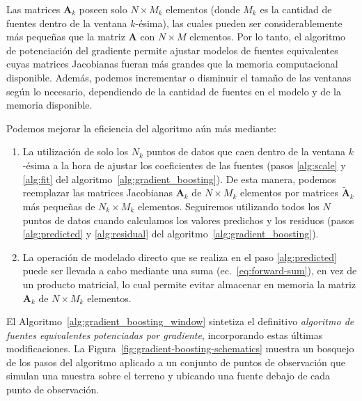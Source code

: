 Las matrices $\mathbf{A}_k$ poseen solo $N \times M_k$ elementos (donde $M_k$
es la cantidad de fuentes dentro de la ventana $k$-ésima), las cuales pueden
ser considerablemente más pequeñas que la matriz $\mathbf{A}$ con $N \times M$
elementos.
Por lo tanto, el algoritmo de potenciación del gradiente permite ajustar
modelos de fuentes equivalentes cuyas matrices Jacobianas fueran más grandes
que la memoria computacional disponible.
Además, podemos incrementar o disminuir el tamaño de las ventanas según lo
necesario, dependiendo de la cantidad de fuentes en el modelo y de la memoria
disponible.

Podemos mejorar la eficiencia del algoritmo aún más mediante:

\begin{enumerate}
  \item La utilización de solo los $N_k$ puntos de datos que caen dentro de la
      ventana $k$-ésima a la hora de ajustar los coeficientes de las fuentes
      (pasos \ref{alg:scale} y \ref{alg:fit} del
      algoritmo~\ref{alg:gradient_boosting}).
      De esta manera, podemos reemplazar las matrices Jacobianas $\mathbf{A}_k$
      de $N \times M_k$ elementos por matrices $\tilde{\mathbf{A}}_k$ más
      pequeñas de $N_k \times M_k$ elementos.
      Seguiremos utilizando todos los $N$ puntos de datos cuando calculamos los
      valores predichos y los residuos (pasos \ref{alg:predicted}
      y \ref{alg:residual} del algoritmo~\ref{alg:gradient_boosting}).
  \item La operación de modelado directo que se realiza en el paso \ref{alg:predicted}
      puede ser llevada a cabo mediante una suma (ec.~\ref{eq:forward-sum}),
      en vez de un producto matricial, lo cual permite evitar almacenar en
      memoria la matriz $\mathbf{A}_k$ de $N \times M_k$ elementos.
\end{enumerate}

El Algoritmo~\ref{alg:gradient_boosting_window} sintetiza el definitivo
\textit{algoritmo de fuentes equivalentes potenciadas por gradiente},
incorporando estas últimas modificaciones.
La Figura~\ref{fig:gradient-boosting-schematics} muestra un bosquejo de los
pasos del algoritmo aplicado a un conjunto de puntos de observación que simulan
una muestra sobre el terreno y ubicando una fuente debajo de cada punto de
observación.

